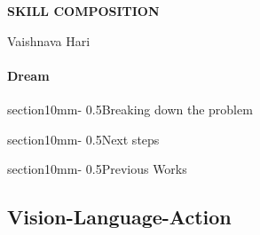 \documentclass[11pt,a4paper]{article}
\makeatletter
\renewcommand{\section}{\@startsection%
{section}{1}{0mm}{-\baselineskip}%
{0.5\baselineskip}{\normalfont\Large\bfseries}}%
\makeatother
\begin{document}


\pagestyle{plain}

\begin{center} 
\bfseries\uppercase{Skill composition}
\end{center}
\vspace{-0.3cm}
\centerline{{Vaishnava Hari}}


\paragraph{Dream}
    

\section{Breaking down the problem}
    

\section{Next steps}
    
\section{Previous Works}

    \subsection{Vision-Language-Action}
        



%     

%     

%     



\end{document}
